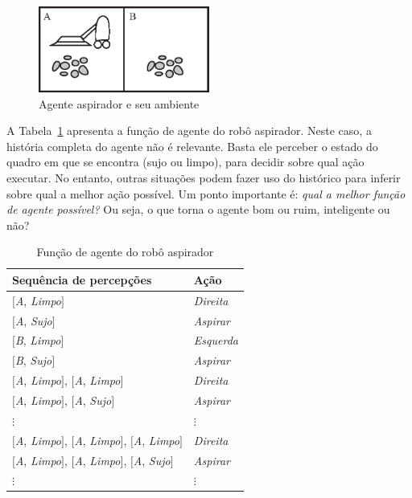 \begin{figure}[h]
	\centering
	\includegraphics[width=0.5\textwidth]{img/agente-aspirador.eps}
	\caption{Agente aspirador e seu ambiente}
	\label{fig:agente-aspirador}
\end{figure}

A Tabela~\ref{tab:tabulacao-agente-aspirador} apresenta a função de agente do robô aspirador. Neste caso, a história completa do agente não é relevante. Basta ele perceber o estado do quadro em que se encontra (sujo ou limpo), para decidir sobre qual ação executar. No entanto, outras situações podem fazer uso do histórico para inferir sobre qual a melhor ação possível. Um ponto importante é: \textit{qual a melhor função de agente possível?} Ou seja, o que torna o agente bom ou ruim, inteligente ou não?

\begin{table}[h]
	\centering
	\begin{tabular}{p{13cm}l}
		\hline
		\textbf{Sequência de percepções} & \textbf{Ação} \\
		\hline
		$[$\textit{A}, \textit{Limpo}$]$ & \textit{Direita} \\
		$[$\textit{A}, \textit{Sujo}$]$ & \textit{Aspirar} \\
		$[$\textit{B}, \textit{Limpo}$]$ & \textit{Esquerda} \\
		$[$\textit{B}, \textit{Sujo}$]$ & \textit{Aspirar} \\
		$[$\textit{A}, \textit{Limpo}$]$, $[$\textit{A}, \textit{Limpo}$]$ & \textit{Direita} \\
		$[$\textit{A}, \textit{Limpo}$]$, $[$\textit{A}, \textit{Sujo}$]$ & \textit{Aspirar} \\
		$\vdots$ & $\vdots$ \\
		$[$\textit{A}, \textit{Limpo}$]$, $[$\textit{A}, \textit{Limpo}$]$, $[$\textit{A}, \textit{Limpo}$]$ & \textit{Direita} \\
		$[$\textit{A}, \textit{Limpo}$]$, $[$\textit{A}, \textit{Limpo}$]$, $[$\textit{A}, \textit{Sujo}$]$ & \textit{Aspirar} \\
		$\vdots$ & $\vdots$ \\
		\hline
	\end{tabular}
	\caption{Função de agente do robô aspirador}
	\label{tab:tabulacao-agente-aspirador}
\end{table}

